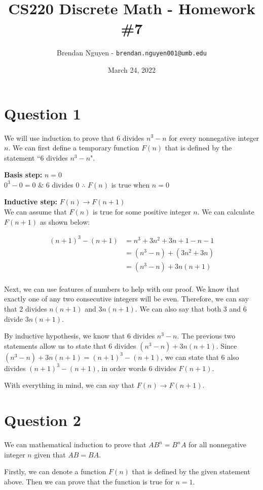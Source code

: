 \documentclass[11pt]{article}
\title{CS220 Discrete Math - Homework \#7}
\author{Brendan Nguyen - \texttt{brendan.nguyen001@umb.edu}}
\date{March 24, 2022}
\begin{document}
\maketitle

\section*{Question 1}
We will use induction to prove that 6 divides $n^3 - n$ for every nonnegative integer $n$. We can first define a temporary function $F(n)$ that is defined by the statement ``6 divides $n^3 - n$".

\textbf{Basis step: } $n = 0$\\
$0^3 - 0 = 0$ $\&$ 6 divides 0 $\therefore$ $F(n)$ is true when $n = 0$

\textbf{Inductive step: } $F(n) \to F(n + 1)$\\
We can assume that $F(n)$ is true for some positive integer $n$. We can calculate $F(n + 1)$ as shown below:

\begin{align*}
    (n + 1)^3 - (n + 1) &= n^3 + 3n^2 + 3n + 1 - n - 1\\
    &= (n^3 - n) + (3n^2 + 3n)\\
    &= (n^3 - n) + 3n(n+1)\\
\end{align*}

Next, we can use features of numbers to help with our proof. We know that exactly one of any two consecutive integers will be even. Therefore, we can say that 2 divides $n(n + 1)$ and $3n(n + 1)$. We can also say that both 3 and 6 divide $3n(n+1)$. 

By inductive hypothesis, we know that 6 divides $n^3 - n$. The previous two statements allow us to state that 6 divides $(n^3 - n) + 3n(n+1)$. Since $(n^3 - n) + 3n(n+1) = (n + 1)^3 - (n + 1)$, we can state that 6 also divides $(n + 1)^3 - (n + 1)$, in order words 6 divides $F(n + 1)$.

With everything in mind, we can say that $F(n) \to F(n + 1)$.

\section*{Question 2}
We can mathematical induction to prove that $AB^n = B^nA$ for all nonnegative integer $n$ given that $AB = BA$. 

Firstly, we can denote a function $F(n)$ that is defined by the given statement above. Then we can prove that the function is true for $n = 1$.
\end{document}

